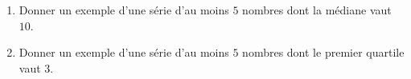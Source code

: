 
\begin{exercice}\label{exoSeconde-0073}

    \begin{enumerate}
        \item
            Donner un exemple d'une série d'au moins \( 5\) nombres dont la médiane vaut \( 10\).
        \item
            Donner un exemple d'une série d'au moins \( 5\) nombres dont le premier quartile vaut \( 3\).
    \end{enumerate}

\end{exercice}
